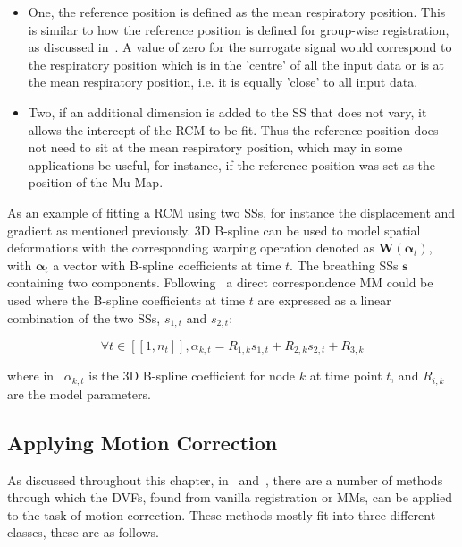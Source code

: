                 \begin{itemize}
                    \item One, the reference position is defined as the mean respiratory position. This is similar to how the reference position is defined for group-wise registration, as discussed in~. A value of zero for the surrogate signal would correspond to the respiratory position which is in the 'centre' of all the input data or is at the mean respiratory position, i.e. it is equally 'close' to all input data.
                    
                    \item Two, if an additional dimension is added to the \gls{SS} that does not vary, it allows the intercept of the \gls{RCM} to be fit. Thus the reference position does not need to sit at the mean respiratory position, which may in some applications be useful, for instance, if the reference position was set as the position of the \gls{Mu-Map}.
                \end{itemize}
                
                As an example of fitting a \gls{RCM} using two \glspl{SS}, for instance the displacement and gradient as mentioned previously. \gls{3D} B-spline can be used to model spatial deformations with the corresponding warping operation denoted as $\mathbf{W}(\mathbf{\alpha}_t)$, with $\mathbf{\alpha}_t$ a vector with B-spline coefficients at time $t$. The breathing \glspl{SS} $\mathbf{s}$ containing two components. Following~\parencite{McClelland2017} a direct correspondence \gls{MM} could be used where the B-spline coefficients at time $t$ are expressed as a linear combination of the two \glspl{SS}, $s_{1,t}$ and $s_{2,t}$:
            
                \begin{equation}\label{eq:respiratory_correspondence_model_motion_parameters}
                    \forall t \in [[1, n_t]], \alpha_{k, t} = R_{1, k} s_{1, t} + R_{2, k} s_{2, t} + R_{3, k}
                \end{equation}
                
                \noindent where in~ $\alpha_{k,t}$ is the \gls{3D} B-spline coefficient for node $k$ at time point $t$, and $R_{i,k}$ are the model parameters.
        
        \subsection{Applying Motion Correction} \label{sec:applying_motion_correction}
            As discussed throughout this chapter, in~ and~, there are a number of methods through which the \glspl{DVF}, found from vanilla registration or \glspl{MM}, can be applied to the task of motion correction. These methods mostly fit into three different classes, these are as follows.
            
